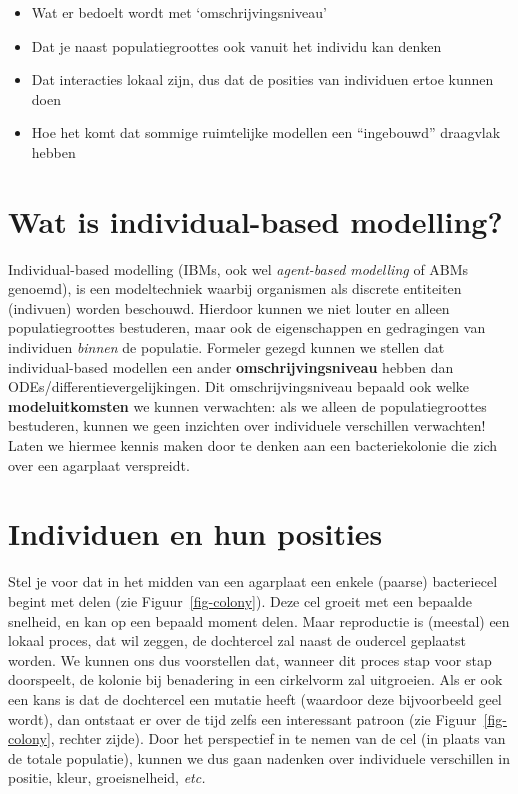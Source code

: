 \documentclass[
  a4paper,
]{scrbook}
\providecommand{\tightlist}{%
  \setlength{\itemsep}{0pt}\setlength{\parskip}{0pt}}\usepackage{longtable,booktabs,array}
\theoremstyle{definition}
\theoremstyle{remark}
\begin{document}
\begin{itemize}
\tightlist
\item
  Wat er bedoelt wordt met `omschrijvingsniveau'
\item
  Dat je naast populatiegroottes ook vanuit het individu kan denken
\item
  Dat interacties lokaal zijn, dus dat de posities van individuen ertoe
  kunnen doen
\item
  Hoe het komt dat sommige ruimtelijke modellen een ``ingebouwd''
  draagvlak hebben
\end{itemize}

\hypertarget{wat-is-individual-based-modelling}{%
\section{Wat is individual-based
modelling?}\label{wat-is-individual-based-modelling}}

Individual-based modelling (IBMs, ook wel \emph{agent-based modelling}
of ABMs genoemd), is een modeltechniek waarbij organismen als discrete
entiteiten (indivuen) worden beschouwd. Hierdoor kunnen we niet louter
en alleen populatiegroottes bestuderen, maar ook de eigenschappen en
gedragingen van individuen \emph{binnen} de populatie. Formeler gezegd
kunnen we stellen dat individual-based modellen een ander
\textbf{omschrijvingsniveau} hebben dan ODEs/differentievergelijkingen.
Dit omschrijvingsniveau bepaald ook welke \textbf{modeluitkomsten} we
kunnen verwachten: als we alleen de populatiegroottes bestuderen, kunnen
we geen inzichten over individuele verschillen verwachten! Laten we
hiermee kennis maken door te denken aan een bacteriekolonie die zich
over een agarplaat verspreidt.

\hypertarget{individuen-en-hun-posities}{%
\section{Individuen en hun posities}\label{individuen-en-hun-posities}}

Stel je voor dat in het midden van een agarplaat een enkele (paarse)
bacteriecel begint met delen (zie Figuur~\ref{fig-colony}). Deze cel
groeit met een bepaalde snelheid, en kan op een bepaald moment delen.
Maar reproductie is (meestal) een lokaal proces, dat wil zeggen, de
dochtercel zal naast de oudercel geplaatst worden. We kunnen ons dus
voorstellen dat, wanneer dit proces stap voor stap doorspeelt, de
kolonie bij benadering in een cirkelvorm zal uitgroeien. Als er ook een
kans is dat de dochtercel een mutatie heeft (waardoor deze bijvoorbeeld
geel wordt), dan ontstaat er over de tijd zelfs een interessant patroon
(zie Figuur~\ref{fig-colony}, rechter zijde). Door het perspectief in te
nemen van de cel (in plaats van de totale populatie), kunnen we dus gaan
nadenken over individuele verschillen in positie, kleur, groeisnelheid,
\emph{etc.}
\end{document}
